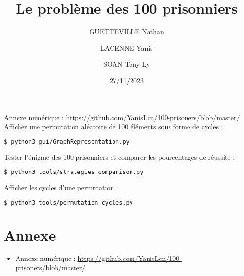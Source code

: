 \documentclass[a4paper]{article}
\title{Le problème des 100 prisonniers}
\date{27/11/2023}
\author{GUETTEVILLE Nathan}
\author{LACENNE Yanis}
\author{SOAN Tony Ly}
\affil{G4S12}
\begin{document}
\maketitle

\noindent Annexe numérique : \url{https://github.com/YanisLcn/100-prisoners/blob/master/} \\

\noindent Afficher une permutation aléatoire de 100 éléments sous forme de cycles :
\begin{lstlisting}[language=bash]
$ python3 gui/GraphRepresentation.py
\end{lstlisting} 

\noindent Tester l'énigme des 100 prisonniers et comparer les pourcentages de réussite :
\begin{lstlisting}[language=bash]
$ python3 tools/strategies_comparison.py
\end{lstlisting}

\noindent Afficher les cycles d'une permutation
\begin{lstlisting}[language=bash]
$ python3 tools/permutation_cycles.py
\end{lstlisting} 


\tableofcontents

\newpage











\section{Annexe}
\begin{itemize}
	\item Annexe numérique : \url{https://github.com/YanisLcn/100-prisoners/blob/master/}

\end{itemize}


\end{document}
